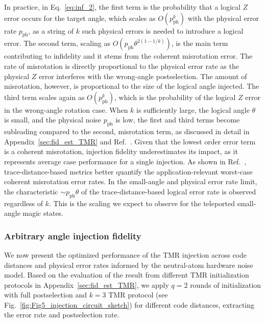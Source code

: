 \documentclass[aps, prx, reprint, superscriptaddress, longbibliography, floatfix]{revtex4-2}
\begin{document}
In practice, in Eq.~\ref{eq:inf_2}, the first term is the probability that a logical $Z$ error occurs for the target angle, which scales as $O(p_{\mathrm{ph}}^k)$ with the physical error rate $p_{\mathrm{ph}}$, as a string of $k$ such physical errors is needed to introduce a logical error. The second term, scaling as $O( p_{\mathrm{ph}}\theta^{2(1-1/k)})$, is the main term contributing to infidelity and it stems from the coherent misrotation error. The rate of misrotation is directly proportional to the physical error rate as the physical $Z$ error interferes with the wrong-angle postselection. The amount of misrotation, however, is proportional to the size of the logical angle injected. The third term scales again as $O(p_{\mathrm{ph}}^k)$, which is the probability of the logical $Z$ error in the wrong-angle rotation case. When $k$ is sufficiently large, the logical angle $\theta$ is small, and the physical noise $p_{\mathrm{ph}}$ is low, the first and third terms become subleading compared to the second, misrotation term, as discussed in detail in Appendix~\ref{sec:fid_est_TMR} and Ref.~\cite{Toshio2024}. Given that the lowest order error term is a coherent misrotation, injection fidelity underestimates its impact, as it represents average case performance for a single injection. As shown in Ref.~\cite{Toshio2024}, trace-distance-based metrics better quantify the application-relevant worst-case coherent misrotation error rates. In the small-angle and physical error rate limit, the characteristic $\sim p_{\mathrm{ph}}\theta$ of the trace-distance-based logical error rate is observed regardless of $k$. This is the scaling we expect to observe for the teleported small-angle magic states.


\subsubsection{Arbitrary angle injection fidelity}
\label{sec:inj_fid}


We now present the optimized performance of the TMR injection across code distances and physical error rates informed by the neutral-atom hardware noise model. Based on the evaluation of the result from different TMR initialization protocols in Appendix~\ref{sec:fid_est_TMR}, we apply $q=2$ rounds of initialization with full postselection and $k=3$ TMR protocol (see Fig.~\ref{fig:Fig5_injection_circuit_sketch}) for different code distances, extracting the error rate and postselection rate.
\end{document}
